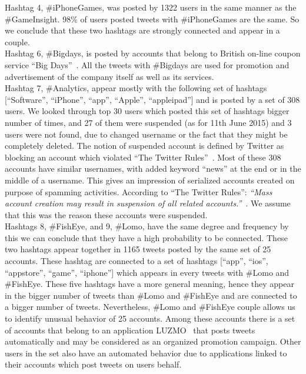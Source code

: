 \documentclass[journal, a4paper, 12pt]{article}
\begin{document}
Hashtag 4, \#iPhoneGames, was posted by 1322 users in the same manner as the \#GameInsight. 98\% of users posted tweets with \#iPhoneGames are the same. So we conclude that these two hashtags are strongly connected and appear in a couple. \\

Hashtag 6, \#Bigdays, is posted by accounts that belong to British on-line coupon service ``Big Days''~\cite{big_days}. All the tweets with \#Bigdays are used for promotion and advertisement of the company itself as well as its services. \\

Hashtag 7, \#Analytics, appear mostly with the following set of hashtags [``Software'', ``iPhone'', ``app'', ``Apple'', ``appleipad''] and is posted by a set of 308 users. We looked through top 30 users which posted this set of hashtags bigger number of times, and 27 of them were suspended (as for 11th June 2015) and 3 users were not found, due to changed username or the fact that they might be completely deleted. The notion of suspended account is defined by Twitter as blocking an account which violated ``The Twitter Rules''~\cite{twitter_rules}. Most of these 308 accounts have similar usernames, with added keyword ``news'' at the end or in the middle of a username. This gives an impression of serialized accounts created on purpose of spamming activities. According to ``The Twitter Rules'': \textit{``Mass account creation may result in suspension of all related accounts.''}~\cite{twitter_rules}. We assume that this was the reason these accounts were suspended.
\\

Hashtags 8, \#FishEye, and 9, \#Lomo, have the same degree and frequency by this we can conclude that they have a high probability to be connected. These two hashtags appear together in 1165 tweets posted by the same set of 25 accounts. These hashtag are connected to a set of hashtags [``app'', ``ios'', ``appstore'', ``game'', ``iphone''] which appears in every tweets with \#Lomo and \#FishEye. These five hashtags have a more general meaning, hence they appear in the bigger number of tweets than \#Lomo and \#FishEye and are connected to a bigger number of tweets. Nevertheless, \#Lomo and \#FishEye couple allows us to identify unusual behavior of 25 accounts. Among these accounts there is a set of accounts that belong to an application LUZMO~\cite{itunes_luzmo} that posts tweets automatically and may be considered as an organized promotion campaign. Other users in the set also have an automated behavior due to applications linked to their accounts which post tweets on users behalf.
\\
\end{document}
